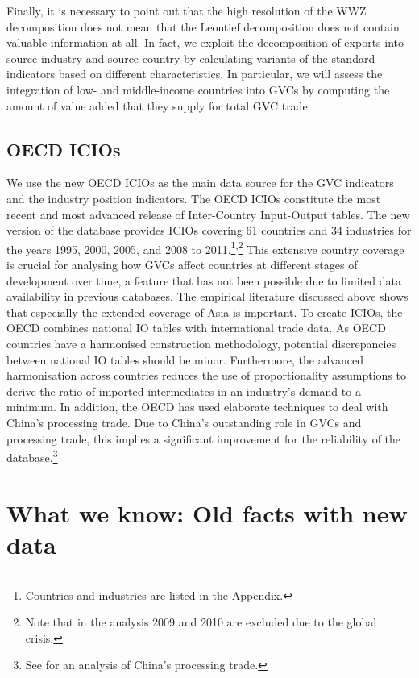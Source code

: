 \documentclass[11pt,a4paper]{article}
\begin{document}
Finally, it is necessary to point out that the high resolution of the WWZ decomposition does not mean that the Leontief decomposition does not contain valuable information at all. In fact, we exploit the decomposition of exports into source industry and source country by calculating variants of the standard indicators based on different characteristics. In particular, we will assess the integration of low- and middle-income countries into GVCs by computing the amount of value added that they supply for total GVC trade.


\subsection{OECD ICIOs}\label{sub:icios}
We use the new OECD ICIOs as the main data source for the GVC indicators and the industry position indicators. The OECD ICIOs constitute the most recent and most advanced release of Inter-Country Input-Output tables. The new version of the database provides ICIOs covering 61 countries and 34 industries for the years 1995, 2000, 2005, and 2008 to 2011.\footnote{Countries and industries are listed in the Appendix.}\textsuperscript{,}\footnote{Note that in the analysis 2009 and 2010 are excluded due to the global crisis.} This extensive country coverage is crucial for analysing how GVCs affect countries at different stages of development over time, a feature that has not been possible due to limited data availability in previous databases. The empirical literature discussed above shows that especially the extended coverage of Asia is important. To create ICIOs, the OECD combines national IO tables with international trade data. As OECD countries have a harmonised construction methodology, potential discrepancies between national IO tables should be minor. Furthermore, the advanced harmonisation across countries reduces the use of proportionality assumptions to derive the ratio of imported intermediates in an industry's demand to a minimum. In addition, the OECD has used elaborate techniques to deal with China's processing trade. Due to China's outstanding role in GVCs and processing trade, this implies a significant improvement for the reliability of the database.\footnote{See \citet{rokoetal12} for an analysis of China's processing trade.}



\section{What we know: Old facts with new data}\label{sec:basics}
\end{document}

